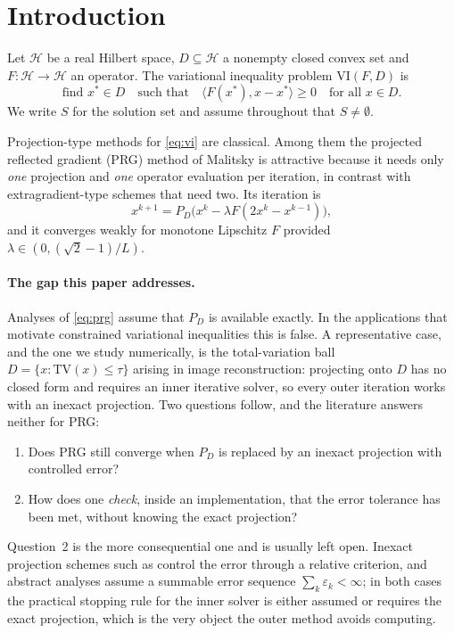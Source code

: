 \documentclass[11pt]{article}
\theoremstyle{plain}
\theoremstyle{definition}
\theoremstyle{remark}
\newcommand{\HH}{\mathcal{H}}
\newcommand{\inner}[2]{\langle #1, #2 \rangle}
\newcommand{\proj}[1]{P_{#1}}
\newcommand{\TV}{\mathrm{TV}}
\begin{document}
\section{Introduction}
\label{sec:intro}

Let $\HH$ be a real Hilbert space, $D \subseteq \HH$ a nonempty closed convex
set and $F : \HH \to \HH$ an operator. The variational inequality problem
$\mathrm{VI}(F,D)$ is
\begin{equation}
\label{eq:vi}
\text{find } x^\ast \in D \quad\text{such that}\quad
\inner{F(x^\ast)}{x - x^\ast} \ge 0 \quad \text{for all } x \in D .
\end{equation}
We write $S$ for the solution set and assume throughout that $S \neq
\emptyset$.

Projection-type methods for \eqref{eq:vi} are classical. Among them the
projected reflected gradient (PRG) method of Malitsky \cite{Malitsky2015} is
attractive because it needs only \emph{one} projection and \emph{one} operator
evaluation per iteration, in contrast with extragradient-type schemes that need
two. Its iteration is
\begin{equation}
\label{eq:prg}
x^{k+1} = \proj{D}\bigl( x^k - \lambda F(2x^k - x^{k-1}) \bigr),
\end{equation}
and it converges weakly for monotone Lipschitz $F$ provided $\lambda \in
(0,(\sqrt{2}-1)/L)$.

\paragraph{The gap this paper addresses.}
Analyses of \eqref{eq:prg} assume that $\proj{D}$ is available exactly. In the
applications that motivate constrained variational inequalities this is false.
A representative case, and the one we study numerically, is the total-variation
ball $D = \{x : \TV(x) \le \tau\}$ arising in image reconstruction: projecting
onto $D$ has no closed form and requires an inner iterative solver, so every
outer iteration works with an inexact projection. Two questions follow, and the
literature answers neither for PRG:
\begin{enumerate}
\item Does PRG still converge when $\proj{D}$ is replaced by an inexact
      projection with controlled error?
\item How does one \emph{check}, inside an implementation, that the error
      tolerance has been met, without knowing the exact projection?
\end{enumerate}
Question~2 is the more consequential one and is usually left open. Inexact
projection schemes such as \cite{DiazMillan2024} control the error through a
relative criterion, and abstract analyses assume a summable error sequence
$\sum_k \varepsilon_k < \infty$; in both cases the practical stopping rule for
the inner solver is either assumed or requires the exact projection, which is
the very object the outer method avoids computing.
\end{document}
